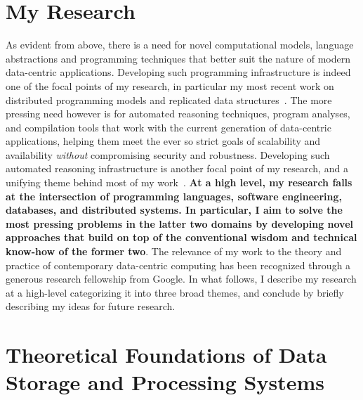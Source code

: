 \section*{My Research}

As evident from above, there is a need for novel computational models,
language abstractions and programming techniques that better suit the
nature of modern data-centric applications. Developing such
programming infrastructure is indeed one of the focal points of my
research, in particular my most recent work on distributed programming
models and replicated data structures~\cite{oopsla19,snapl19,thesis}.
The more pressing need however is for automated reasoning techniques,
program analyses, and compilation tools that work with the current
generation of data-centric applications, helping them meet the ever so
strict goals of scalability and availability \emph{without}
compromising security and robustness. Developing such automated
reasoning infrastructure is another focal point of my research, and a
unifying theme behind most of my
work~\cite{popl18,oopsla18,ecoop18,icfp14,pldi15}. \textbf{At a high level, my
research falls at the intersection of programming languages, software
engineering, databases, and distributed systems. In particular, I aim
to solve the most pressing problems in the latter two domains by
developing novel approaches that build on top of the conventional
wisdom and technical know-how of the former two}. The relevance
of my work to the theory and practice of contemporary data-centric
computing has been recognized through a generous research fellowship
from Google. In what follows, I describe my research at a high-level
categorizing it into three broad themes, and conclude by briefly
describing my ideas for future research.

\section*{Theoretical Foundations of Data Storage and Processing
Systems}

